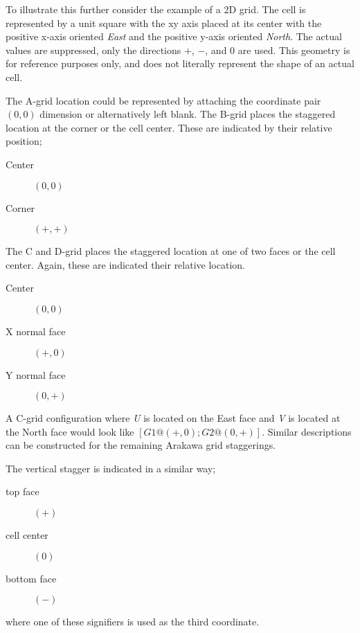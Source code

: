\documentclass{article}
\begin{document}
To illustrate this further consider the example of a 2D grid. The cell is represented by a unit square with the xy axis placed at its center with the positive x-axis oriented {\em East} and the positive y-axis oriented {\em North}. The actual values are suppressed, only the directions $+$, $-$, and $0$ are used. This geometry is for reference purposes only, and does not literally represent the shape of an actual cell. 

The A-grid location could be represented by attaching the coordinate pair $(0,0)$ dimension or alternatively left blank. The B-grid places the staggered location at the corner or the cell center. These are indicated by their relative position;
\begin{description}
	\item [Center] $(0,0)$
	\item [Corner] $(+,+)$
\end{description}  
The C and D-grid places the staggered location at one of two faces or the cell center. Again, these are indicated their relative location.
\begin{description}
	\item [Center] $(0,0)$
	\item [X normal face] $(+,0)$
	\item [Y normal face] $(0,+)$
\end{description}  

A C-grid configuration where {\em U} is located on the East face and {\em V} is located at the North face would look like $[ G1 @(+,0) ; G2 @ (0,+)]$. Similar descriptions can be constructed for the remaining Arakawa grid staggerings. 

The vertical stagger is indicated in a similar way;  
\begin{description}
	\item [top face] $(+)$
	\item [cell center] $(0)$
	\item [bottom face] $(-)$
\end{description}
where one of these signifiers is used as the third coordinate.
\end{document}
